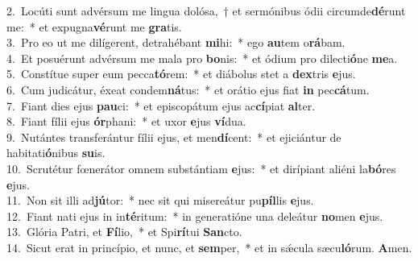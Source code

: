 {2.~}Locúti sunt advérsum me lingua dolósa,~† et sermónibus ódii circumde\textbf{dé}runt me:~* et expugna\textbf{vé}runt me \textbf{gra}tis.\\
{3.~}Pro eo ut me dilígerent, detrahébant \textbf{mi}hi:~* ego \textbf{au}tem o\textbf{rá}bam.\\
{4.~}Et posuérunt advérsum me mala pro \textbf{bo}nis:~* et ódium pro dilecti\textbf{ó}ne \textbf{me}a.\\
{5.~}Constítue super eum pecca\textbf{tó}rem:~* et diábolus stet a \textbf{dex}tris \textbf{e}jus.\\
{6.~}Cum judicátur, éxeat condem\textbf{ná}tus:~* et orátio ejus fiat \textbf{in} pec\textbf{cá}tum.\\
{7.~}Fiant dies ejus \textbf{pau}ci:~* et episcopátum ejus ac\textbf{cí}piat \textbf{al}ter.\\
{8.~}Fiant fílii ejus \textbf{ór}phani:~* et uxor \textbf{e}jus \textbf{ví}dua.\\
{9.~}Nutántes transferántur fílii ejus, et men\textbf{dí}cent:~* et ejiciántur de habitati\textbf{ó}nibus \textbf{su}is.\\
{10.~}Scrutétur fœnerátor omnem substántiam \textbf{e}jus:~* et dirípiant aliéni la\textbf{bó}res \textbf{e}jus.\\
{11.~}Non sit illi ad\textbf{jú}tor:~* nec sit qui misereátur pu\textbf{píl}lis \textbf{e}jus.\\
{12.~}Fiant nati ejus in in\textbf{té}ritum:~* in generatióne una deleátur \textbf{no}men \textbf{e}jus.\\
{13.~}Glória Patri, et \textbf{Fí}lio,~* et Spi\textbf{rí}tui \textbf{San}cto.\\
{14.~}Sicut erat in princípio, et nunc, et \textbf{sem}per,~* et in sǽcula sæcu\textbf{ló}rum. \textbf{A}men.\\
